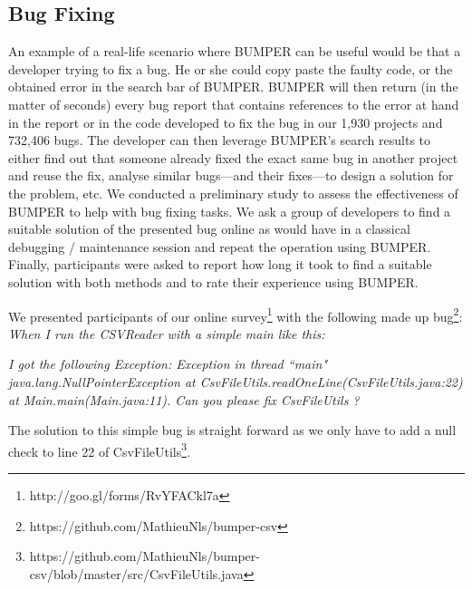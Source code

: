 \documentclass[conference]{IEEEtran}
\begin{document}
\subsection{Bug Fixing}
\label{subs:Bug Fixing}


An example of a real-life scenario where BUMPER can be useful would be that a developer trying to fix a bug. He or she could copy paste the faulty code, or the obtained error in the search bar of BUMPER. BUMPER will then return (in the matter of seconds) every bug report that contains references to the error at hand in the report or in the code developed to fix the bug in our 1,930 projects and 732,406 bugs. The developer can then leverage BUMPER’s search results to either find out that someone already fixed the exact same bug in another project and reuse the fix, analyse similar bugs—and their fixes—to design a solution for the problem, etc.
We conducted a preliminary study to assess the effectiveness of BUMPER to help with bug fixing tasks.
We ask a group of developers to find a suitable solution of the presented bug online as would have in a classical debugging / maintenance session and repeat the operation using BUMPER.
Finally, participants were asked to report how long it took to find a suitable solution with both methods and to rate their experience using BUMPER.

We presented participants of our online survey\footnote{http://goo.gl/forms/RvYFACkl7a} with the following made up bug\footnote{https://github.com/MathieuNls/bumper-csv}: \textit{When I run the CSVReader with a simple main like this:}

\noindent\begin{minipage}{0.90\linewidth}

  

\end{minipage}

\textit{I got the following Exception: Exception in thread ``main" java.lang.NullPointerException at CsvFileUtils.readOneLine(CsvFileUtils.java:22) at Main.main(Main.java:11). Can you please fix CsvFileUtils ?}

The solution to this simple bug is straight forward as we only have to add a null check to line 22 of CsvFileUtils\footnote{https://github.com/MathieuNls/bumper-csv/blob/master/src/CsvFileUtils.java}.
\end{document}
